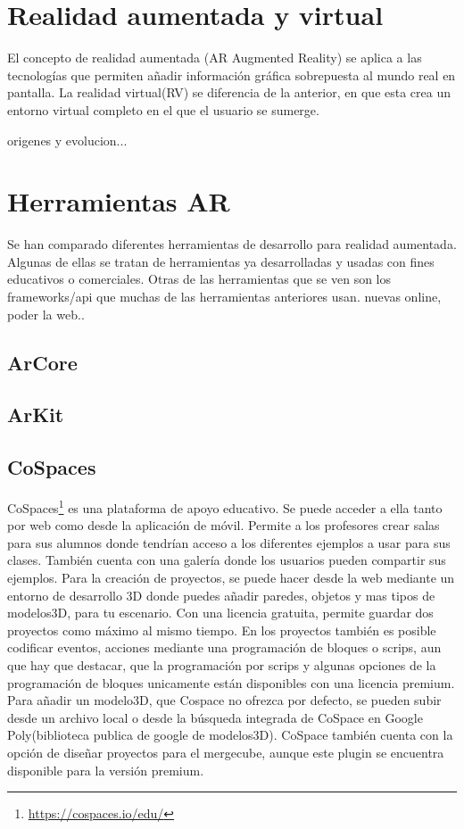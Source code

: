 

\section{Realidad aumentada y virtual}
El concepto de realidad aumentada (AR Augmented Reality) se aplica a las tecnologías que permiten añadir información gráfica sobrepuesta al mundo real en pantalla.
La realidad virtual(RV) se diferencia de la anterior, en que esta crea un entorno virtual completo en el que el usuario se sumerge.
 
origenes y evolucion...




\section{Herramientas AR}
Se han comparado diferentes herramientas de desarrollo para realidad aumentada. Algunas de ellas se tratan de herramientas ya desarrolladas y usadas con fines educativos o comerciales. Otras de las herramientas que se ven son los frameworks/api que muchas de las herramientas anteriores usan.
nuevas online, poder la web.. 

\subsection{ArCore}
\subsection{ArKit}
\subsection{CoSpaces} CoSpaces\footnote{\url{https://cospaces.io/edu/}} es una plataforma de apoyo educativo. Se puede acceder a ella tanto por web como desde la aplicación de móvil. Permite a los profesores crear salas para sus alumnos donde tendrían acceso a los diferentes ejemplos a usar para sus clases. También cuenta con una galería donde los usuarios pueden compartir sus ejemplos.
Para la creación de proyectos, se puede hacer desde la web mediante un entorno de desarrollo 3D donde puedes añadir paredes, objetos y mas tipos de modelos3D, para tu escenario. Con una licencia gratuita, permite guardar dos proyectos como máximo al mismo tiempo. En los proyectos también es posible codificar eventos, acciones mediante una programación de bloques o scrips, aun que hay que destacar, que la programación por scrips y algunas opciones de la programación de bloques unicamente están disponibles con una licencia premium. Para añadir un modelo3D, que Cospace no ofrezca por defecto, se pueden subir desde un archivo local o desde la búsqueda integrada de CoSpace en Google Poly(biblioteca publica de google de modelos3D).
CoSpace también cuenta con la opción de diseñar proyectos para el mergecube, aunque este plugin se encuentra disponible para la versión premium.


